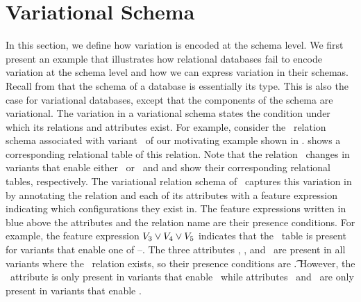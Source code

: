 \section{Variational Schema}
\label{sec:vsch}

In this section, we define how variation is encoded at the schema level. We first 
present an example that
 illustrates how relational databases fail to encode
variation at the schema level and how we can express variation in their schemas.
Recall from  that the schema of a database is essentially its type.
This is also the case for variational databases, except that the components 
of the schema are variational.
The  variation in a variational schema states the condition under which its relations and
attributes exist.
%
For example, consider the \empbio\ relation schema associated with 
variant \vThree\ of our motivating example shown in .
 shows a corresponding relational table of this relation. 
% 
Note that the relation \empbio\ changes in variants that enable either \vFour\ or \vFive\
and  and  show their corresponding relational tables, 
respectively.
%
The variational relation schema of \empbio\ captures this variation
in \tabref{empbio-vsch} by annotating the relation and each of its attributes with
 a feature expression indicating which configurations they exist in.
%
The feature expressions written in blue above the attributes and the relation name
are their presence conditions. 
For example, the feature expression $\vThree \vee \vFour \vee \vFive$ indicates that the
\empbio\ table is present for variants that enable one of \vThree--\vFive. 
%
The three attributes 
\empno, \sex, and \birthdate\ are present in all variants where the \empbio\ relation exists,
so their presence conditions are \t. 
However, the \name\ attribute is only present in variants
that enable \vFour\ while attributes \fname\ and \lname\ are only present in variants
that enable \vFive.



